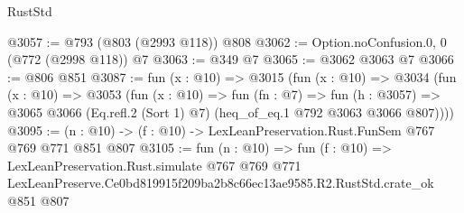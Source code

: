 \begin{lexlean}{RustStd}
\begin{coremodule}
@3057 := @793 (@803 (@2993 @118)) @808
@3062 := Option.noConfusion.{0, 0} (@772 (@2998 @118)) @7
@3063 := @349 @7
@3065 := @3062 @3063 @7
@3066 := @806 @851
@3087 := fun (x : @10) =>
  @3015
    (fun (x : @10) =>
    @3034
      (fun (x : @10) =>
      @3053
        (fun (x : @10) =>
        fun (fn : @7) =>
        fun (h : @3057) =>
        @3065 @3066 (Eq.refl.{2} (Sort 1) @7) (heq_of_eq.{1} @792 @3063 @3066 @807))))
@3095 := (n : @10) -> (f : @10) -> LexLeanPreservation.Rust.FunSem @767 @769 @771 @851 @807
@3105 := fun (n : @10) =>
  fun (f : @10) =>
  LexLeanPreservation.Rust.simulate
    @767
    @769
    @771
    LexLeanPreserve.Ce0bd819915f209ba2b8c66ec13ae9585.R2.RustStd.crate_ok
    @851
    @807
\end{coremodule}
\end{lexlean}
